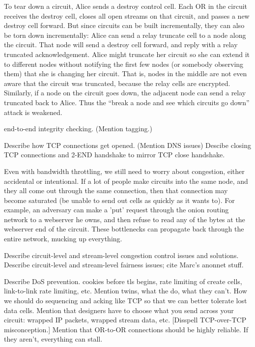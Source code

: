 \documentclass[times,10pt,twocolumn]{article}
\begin{document}
To tear down a circuit, Alice sends a destroy control cell. Each OR
in the circuit receives the destroy cell, closes all open streams on
that circuit, and passes a new destroy cell forward. But since circuits
can be built incrementally, they can also be torn down incrementally:
Alice can send a relay truncate cell to a node along the circuit. That
node will send a destroy cell forward, and reply with a relay truncated
acknowledgement. Alice might truncate her circuit so she can extend it
to different nodes without notifying the first few nodes (or somebody
observing them) that she is changing her circuit. That is, nodes in the
middle are not even aware that the circuit was truncated, because the
relay cells are encrypted. Similarly, if a node on the circuit goes down,
the adjacent node can send a relay truncated back to Alice. Thus the
``break a node and see which circuits go down'' attack is weakened.


end-to-end integrity checking.  (Mention tagging.)

\label{subsec:tcp}

Describe how TCP connections get opened.  (Mention DNS issues)
Descibe closing TCP connections and 2-END handshake to mirror TCP
close handshake.

\label{subsec:congestion}

Even with bandwidth throttling, we still need to worry about congestion,
either accidental or intentional. If a lot of people make circuits into
the same node, and they all come out through the same connection, then
that connection may become saturated (be unable to send out cells as
quickly as it wants to). For example, an adversary can make a 'put'
request through the onion routing network to a webserver he owns,
and then refuse to read any of the bytes at the webserver end of the
circuit. These bottlenecks can propagate back through the entire network,
mucking up everything.


Describe circuit-level and stream-level
congestion control issues and solutions.
Describe circuit-level and stream-level fairness issues; cite Marc's
anonnet stuff.



Describe DoS prevention. cookies before tls begins, rate limiting of
create cells, link-to-link rate limiting, etc.
Mention twins, what the do, what they can't.
How we should do sequencing and acking like TCP so that we can better
tolerate lost data cells.
Mention that designers have to choose what you send across your
  circuit: wrapped IP packets, wrapped stream data, etc.  [Disspell
  TCP-over-TCP misconception.]
Mention that OR-to-OR connections should be highly reliable.  If
  they aren't, everything can stall.
\end{document}
